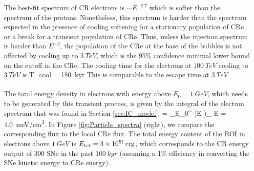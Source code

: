 The best-fit spectrum of CR electrons is $\sim E^{-2.7}$ which is softer than the spectrum of the protons.
Nonetheless, this spectrum is harder than the spectrum expected in the presence of cooling softening
for a stationary population of CRe or a break for a transient population of CRe.
Thus, unless the injection spectrum is harder than $E^{-2}$, the population of the CRe at the base of the 
bubbles is not affected by cooling up to $\SI{3}{TeV}$,
which is the 95\% confidence minimal lower bound on the cutoff in the CRe. 
The cooling time for the electrons at $\SI{100}{TeV}$ cooling to $\SI{3}{TeV}$ is
\be
T_{\rm cool} = \SI{180}{kyr}
\ee
This is comparable to the escape time at $\SI{3}{TeV}$\\
\\
The total energy density in electrons with energy above $E_0 = \SI{1}{GeV}$, which needs to be generated by this transient process, is given by the integral of the electron spectrum that was found in Section \ref{sec:IC_model}:
\be
{} = \int_{E_0}^{\infty} \left(E \right)_{\!\!\el} \de E = \SI{4.0}{meV/cm^3}.
\ee
In Figure \ref{fig:Particle_spectra} (right), we compare the corresponding flux to the local CRe flux.
The total energy content of the ROI in electrons above $\SI{1}{GeV}$ is $E_{\text{tot}} = \SI{3e51}{erg}$, which corresponds to the CR energy output of 300 SNe in the past $\SI{100}{kyr}$ (assuming a 1\% efficiency in converting the SNe kinetic energy to CRe energy). 


